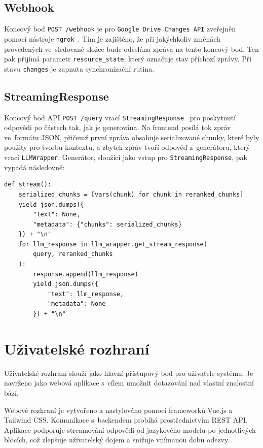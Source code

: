 \subsection{Webhook}
Koncový bod \texttt{POST /webhook} je pro \texttt{Google Drive Changes API} \cite{googledriveapi} zveřejněn pomocí nástroje \texttt{ngrok}~\cite{ngrok}. Tím je zajištěno, že při jakýchkoliv změnách provedených ve~sledované složce bude odeslána zpráva na tento koncový bod. Ten pak přijímá parametr \texttt{resource\_state}, který označuje stav příchozí zprávy. Při stavu \texttt{changes} je zapnuta synchronizační rutina.

\subsection{StreamingResponse}
Koncový bod API \texttt{POST /query} vrací \texttt{StreamingResponse}~\cite{fastapi} pro poskytnutí odpovědi po částech tak, jak je generována. Na frontend posílá tok zpráv ve~formátu JSON, přičemž první zpráva obsahuje serializované chunky, které byly použity pro tvorbu kontextu, a zbytek zpráv tvoří odpověď z~generátoru, který vrací \texttt{LLMWrapper}. Generátor, sloužící jako vstup pro \texttt{StreamingResponse}, pak vypadá následovně:
\begin{verbatim}
def stream():
    serialized_chunks = [vars(chunk) for chunk in reranked_chunks]
    yield json.dumps({
        "text": None,
        "metadata": {"chunks": serialized_chunks}
    }) + "\n"
    for llm_response in llm_wrapper.get_stream_response(
        query, reranked_chunks
    ):
        response.append(llm_response)
        yield json.dumps({
            "text": llm_response,
            "metadata": None
        }) + "\n"
\end{verbatim}

\section{Uživatelské rozhraní}

Uživatelské rozhraní slouží jako hlavní přístupový bod pro uživatele systému. Je navrženo jako webová aplikace s~cílem umožnit dotazování nad vlastní znalostní bází. 

Webové rozhraní je vytvořeno a nastylováno pomocí frameworků Vue.js a Tailwind CSS. Komunikace s~backendem probíhá prostřednictvím REST API. Aplikace podporuje streamování odpovědi od jazykového modelu po jednotlivých blocích, což zlepšuje uživatelský dojem a snižuje vnímanou dobu odezvy. 

